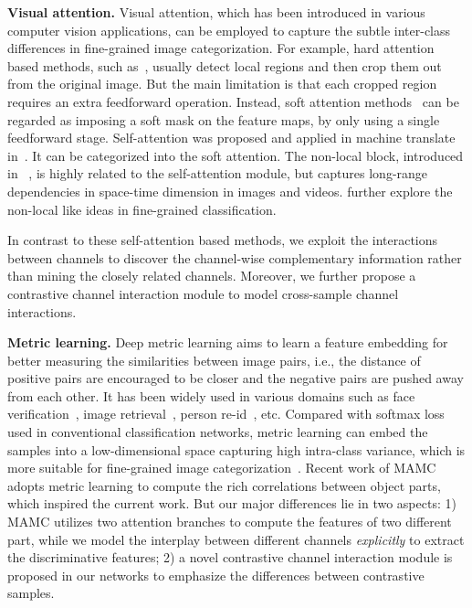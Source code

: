 \documentclass[letterpaper]{article} \usepackage{aaai20}  \usepackage{times}  \usepackage{helvet} \usepackage{courier}  \usepackage[hyphens]{url}  \usepackage{graphicx} \urlstyle{rm} \def\UrlFont{\rm}  \usepackage{graphicx}  \frenchspacing  \setlength{\pdfpagewidth}{8.5in}  \setlength{\pdfpageheight}{11in}  \usepackage{amsmath,amssymb}
\begin{document}
\textbf{Visual attention.}
Visual attention, which has been introduced in various  computer vision applications, can be employed to capture the subtle inter-class differences in fine-grained image categorization.
For example, hard attention based methods, such as~\cite{DBLP:conf/nips/JaderbergSZK15,fu2017look,li2017dynamic,yang2018learning}, usually detect local regions and then crop them out from the original image.
But the main limitation is that each cropped region requires an extra feedforward operation.
Instead, soft attention methods~\cite{zheng2017learning,DBLP:conf/eccv/SunYZD18} can be regarded as imposing a soft mask on the feature maps, by only using a single feedforward stage. Self-attention was proposed and applied in machine translate in~\cite{vaswani2017attention}. It can be categorized into the soft attention. The non-local block, introduced in ~\cite{DBLP:journals/corr/abs-1711-07971}, is highly related to the self-attention module, but captures long-range dependencies in space-time dimension in images and videos. \cite{yue2018compact,DBLP:conf/cvpr/ZhengFZL19} further explore the non-local like ideas in fine-grained classification.

In contrast to these self-attention based methods,
we exploit the interactions between channels to discover
the  channel-wise complementary information rather than mining the closely related channels.
Moreover, we further propose a contrastive channel interaction module to model cross-sample channel interactions.


\textbf{Metric learning.} Deep metric learning aims to learn a feature embedding for better measuring the similarities between image pairs, i.e., the distance of positive pairs are encouraged  to be closer and the negative pairs are pushed away from each other. It has been widely used in various domains such as face verification~\cite{DBLP:conf/cvpr/HuLT14,DBLP:conf/cvpr/SchroffKP15}, image retrieval~\cite{DBLP:conf/cvpr/WangSLRWPCW14}, person re-id~\cite{DBLP:conf/cvpr/ChenCZH17,DBLP:conf/eccv/VariorHW16}, etc.
Compared with softmax loss used in conventional classification networks, metric learning can embed the samples into a low-dimensional space capturing high intra-class variance, which is more suitable for fine-grained image categorization~\cite{DBLP:conf/cvpr/CuiZLB16}.
Recent work of MAMC~\cite{DBLP:conf/eccv/SunYZD18} adopts metric learning to compute the rich correlations between object parts, which inspired the current work.
But our major differences lie in two aspects: 1) MAMC utilizes two attention branches to compute the features of two different part, while we model the interplay between different channels \emph{explicitly} to extract the discriminative features; 2) a novel contrastive channel interaction module is proposed in our networks to emphasize the differences between contrastive samples.
\end{document}

